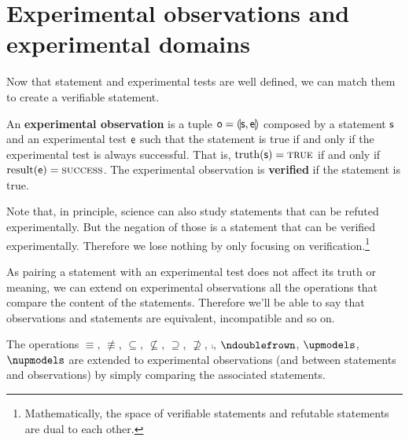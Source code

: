 \documentclass[11pt,letterpaper,fleqn]{memoir} %
\begin{document}
\section{Experimental observations and experimental domains}

Now that statement and experimental tests are well defined, we can match them to create a verifiable statement.

\begin{mathSection}
\begin{defn}
	An \textbf{experimental observation} is a tuple $\mathsf{o} = \llparenthesis \mathsf{s}, \mathsf{e} \rrparenthesis$ composed by a statement $\mathsf{s}$ and an experimental test $\mathsf{e}$ such that the statement is true if and only if the  experimental test is always successful. That is, $\operatorname{truth}(\mathsf{s})=\textsc{true}$ if and only if $\operatorname{result}(\mathsf{e})=\textsc{success}$. The experimental observation is \textbf{verified} if the statement is true.
\end{defn}
\end{mathSection}

Note that, in principle, science can also study statements that can be refuted experimentally. But the negation of those is a statement that can be verified experimentally. Therefore we lose nothing by only focusing on verification.\footnote{Mathematically, the space of verifiable statements and refutable statements are dual to each other.}

As pairing a statement with an experimental test does not affect its truth or meaning, we can extend on experimental observations all the operations that compare the content of the statements. Therefore we'll be able to say that observations and statements are equivalent, incompatible and so on.

\begin{mathSection}
\begin{defn}
	The operations $\equiv$, $\nequiv$, $\subseteq$, $\nsubseteq$, $\supseteq$, $\nsupseteq$, $\comp$, $\ncomp$, $\indep$, $\nindep$ are extended to experimental observations (and between statements and observations) by simply comparing the associated statements.
\end{defn}
\end{mathSection}
\end{document}
